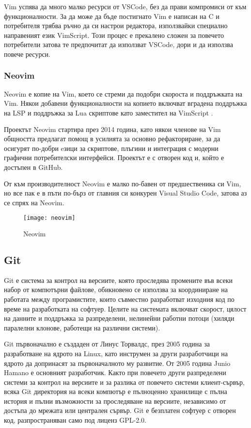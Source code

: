 Vim успява да много малко ресурси от VSCode, без да прави компромиси от към
функционалности. За да може да бъде постигнато Vim е написан на C и потребителя
трябва ръчно да си настрои редактора, използвайки специално направеният език
VimScript. Този процес е прекалено сложен за повечето потребители затова те
предпочитат да използват VSCode, дори и да използва повече ресурси.

\subsubsection{Neovim}
Neovim е копие на Vim, което се стреми да подобри скороста и поддръжката на
Vim. Някои добавени функционалности на копието включват вградена поддръжка на
LSP и поддръжка за Lua скриптове като заместител на VimScript \cite{neovim_wikipedia}.

Проектът Neovim стартира през 2014 година, като някои членове на Vim общността
предлагат помощ в усилията за основно рефакториране, за да осигурят по-добри
eзици за скриптове, плъгини и интеграция с модерни графични потребителски интерфейси.
Проектът е с отворен код и, който е достъпен в GitHub. \cite{neovim_github}

От към производителност Neovim е малко по-бавен от предшественика си Vim, но
все пак е в пъти по-бърз от главния си конкурен Visual Studio Code, затова аз
се спрях на Neovim.

\begin{figure}[!htb]
  \texttt{[image: neovim]}
  \centering
  \caption{Neovim}
  \label{fig:neovim}
\end{figure}

\subsection{Git}
Git е система за контрол на версиите, която проследява промените във всеки
набор от компютърни файлове, обикновено се използва за координиране на работата
между програмистите, които съвместно разработват изходния код по време на
разработката на софтуер. Целите на системата включват скорост, цялост на
данните и поддръжка за разпределени, нелинейни работни потоци (хиляди паралелни
клонове, работещи на различни системи).

Git първоначално е създаден от Линус Торвалдс, през 2005 година за разработване
на ядрото на Linux, като инструмен за други разработчици на ядрото да
допринасят за първоначалното му развитие. От 2005 година Junio Hamano е основният
разработчик. Както при повечето други разпределени системи за контрол на версиите
и за разлика от повечето системи клиент-сървър, всяка Git директория на всеки
компютър е пълноценно хранилище с пълна история и пълни възможности за
проследяване на версиите, независимо от достъпа до мрежата или централен
сървър. Git е безплатен софтуер с отворен код, разпространяван само под лиценз
GPL-2.0. \cite{git_wikipedia}
